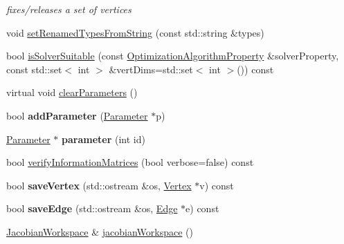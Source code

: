 \begin{DoxyCompactItemize}
\begin{DoxyCompactList}\small\item\em fixes/releases a set of vertices \end{DoxyCompactList}\item 
void \hyperlink{structg2o_1_1OptimizableGraph_afaa77a4624619237563fe94cfd7b76fd}{set\-Renamed\-Types\-From\-String} (const std\-::string \&types)
\item 
bool \hyperlink{structg2o_1_1OptimizableGraph_a4a3a8c7ffa964d2ab27ccdfdaca6a0cc}{is\-Solver\-Suitable} (const \hyperlink{structg2o_1_1OptimizationAlgorithmProperty}{Optimization\-Algorithm\-Property} \&solver\-Property, const std\-::set$<$ int $>$ \&vert\-Dims=std\-::set$<$ int $>$()) const 
\item 
virtual void \hyperlink{structg2o_1_1OptimizableGraph_a15171b6d335115858e2e86dcf576ba78}{clear\-Parameters} ()
\item 
\hypertarget{structg2o_1_1OptimizableGraph_ad4a7c038288097b0b1619c609cf40e90}{bool {\bfseries add\-Parameter} (\hyperlink{classg2o_1_1Parameter}{Parameter} $\ast$p)}\label{structg2o_1_1OptimizableGraph_ad4a7c038288097b0b1619c609cf40e90}

\item 
\hypertarget{structg2o_1_1OptimizableGraph_ad9506880a9289353ddd2277fafb76ffd}{\hyperlink{classg2o_1_1Parameter}{Parameter} $\ast$ {\bfseries parameter} (int id)}\label{structg2o_1_1OptimizableGraph_ad9506880a9289353ddd2277fafb76ffd}

\item 
bool \hyperlink{structg2o_1_1OptimizableGraph_aae5f20da3c13042a9bc1f491f2150d59}{verify\-Information\-Matrices} (bool verbose=false) const 
\item 
\hypertarget{structg2o_1_1OptimizableGraph_a3f254b419e9cc883094d31fdeab76bf7}{bool {\bfseries save\-Vertex} (std\-::ostream \&os, \hyperlink{classg2o_1_1OptimizableGraph_1_1Vertex}{Vertex} $\ast$v) const }\label{structg2o_1_1OptimizableGraph_a3f254b419e9cc883094d31fdeab76bf7}

\item 
\hypertarget{structg2o_1_1OptimizableGraph_ad40a71ebbf3d84a327c47b211e8f0911}{bool {\bfseries save\-Edge} (std\-::ostream \&os, \hyperlink{classg2o_1_1OptimizableGraph_1_1Edge}{Edge} $\ast$e) const }\label{structg2o_1_1OptimizableGraph_ad40a71ebbf3d84a327c47b211e8f0911}

\item 
\hypertarget{structg2o_1_1OptimizableGraph_aa669dbd1d6e34e49fecda711ff1b78c6}{\hyperlink{classg2o_1_1JacobianWorkspace}{Jacobian\-Workspace} \& \hyperlink{structg2o_1_1OptimizableGraph_aa669dbd1d6e34e49fecda711ff1b78c6}{jacobian\-Workspace} ()}\label{structg2o_1_1OptimizableGraph_aa669dbd1d6e34e49fecda711ff1b78c6}


\end{DoxyCompactItemize}
